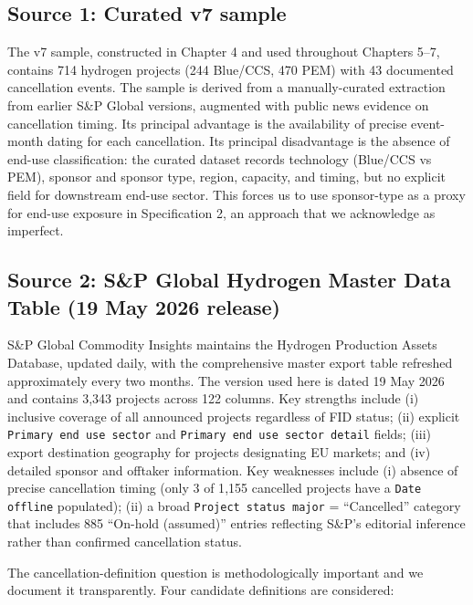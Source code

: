 \documentclass[11pt,a4paper]{article}
\begin{document}
\subsection{Source 1: Curated v7 sample}

The v7 sample, constructed in Chapter 4 and used throughout Chapters 5--7, contains 714 hydrogen projects (244 Blue/CCS, 470 PEM) with 43 documented cancellation events. The sample is derived from a manually-curated extraction from earlier S\&P Global versions, augmented with public news evidence on cancellation timing. Its principal advantage is the availability of precise event-month dating for each cancellation. Its principal disadvantage is the absence of end-use classification: the curated dataset records technology (Blue/CCS vs PEM), sponsor and sponsor type, region, capacity, and timing, but no explicit field for downstream end-use sector. This forces us to use sponsor-type as a proxy for end-use exposure in Specification 2, an approach that we acknowledge as imperfect.

\subsection{Source 2: S\&P Global Hydrogen Master Data Table (19 May 2026 release)}

S\&P Global Commodity Insights maintains the Hydrogen Production Assets Database, updated daily, with the comprehensive master export table refreshed approximately every two months. The version used here is dated 19 May 2026 and contains 3{,}343 projects across 122 columns. Key strengths include (i) inclusive coverage of all announced projects regardless of FID status; (ii) explicit \texttt{Primary end use sector} and \texttt{Primary end use sector detail} fields; (iii) export destination geography for projects designating EU markets; and (iv) detailed sponsor and offtaker information. Key weaknesses include (i) absence of precise cancellation timing (only 3 of 1{,}155 cancelled projects have a \texttt{Date offline} populated); (ii) a broad \texttt{Project status major} = ``Cancelled'' category that includes 885 ``On-hold (assumed)'' entries reflecting S\&P's editorial inference rather than confirmed cancellation status.

The cancellation-definition question is methodologically important and we document it transparently. Four candidate definitions are considered:
\end{document}
